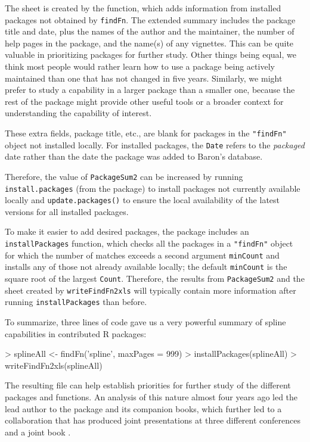 \documentclass[a4paper]{report}
\begin{document}
\begin{article}
The  sheet is created by the
 function, which adds information from
installed packages not obtained by
{\tt findFn}.  The extended summary includes the package title and date, plus
the names of the author and the maintainer, the number of help pages
in the package,
and the name(s) of any vignettes.  This can be quite
valuable in prioritizing packages for further study.
Other things being equal, we think most people would
rather learn how to use a package being actively maintained
than one that has not changed in five years.  Similarly,
we might prefer to study a capability in a larger package
than a smaller one, because the rest of the package might
provide other useful tools or a broader context for
understanding the capability of interest.

These extra fields, package title, etc., are blank for
packages in the {\tt "findFn"} object not installed locally.
For installed packages, the {\tt Date} refers to the \emph{packaged} date rather
than the date the package was added to Baron's database.

Therefore, the value of {\tt PackageSum2} can be
increased by running {\tt install.packages} (from the
 package) to install packages not currently
available locally and {\tt update.packages()} to ensure the
local availability of the latest versions for all
installed packages.

To make it easier to add desired packages,
the  package includes
an {\tt installPackages} function, which checks all the
packages in a {\tt "findFn"} object for which
the number of matches exceeds a second argument {\tt minCount}
and installs any of those not already available locally;  the
default {\tt minCount} is the square root of the largest
{\tt Count}.  Therefore, the results from {\tt PackageSum2} and the
 sheet created by {\tt writeFindFn2xls} will typically
contain more information after running {\tt installPackages}
than before.

To summarize, three lines of code gave us a very powerful
summary of spline capabilities in contributed R
packages:

\begin{Schunk}
\begin{Sinput}
> splineAll <- findFn('spline', maxPages = 999)
> installPackages(splineAll)
> writeFindFn2xls(splineAll)
\end{Sinput}
\end{Schunk}

The resulting  file can help establish priorities
for further study of the different packages and functions.  An
analysis of this nature almost four years ago led the lead author
to the  package and its companion books, which further
led to a collaboration that has produced joint presentations at
three different conferences and a joint book \citep{RHG09}.


\end{article}
\end{document}
